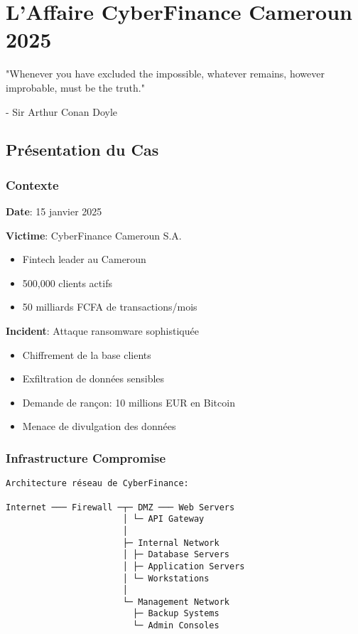 \chapter{L'Affaire CyberFinance Cameroun 2025}
\epigraph{"Whenever you have excluded the impossible, whatever remains, however improbable, must be the truth."}{- Sir Arthur Conan Doyle}
\section{Présentation du Cas}
\subsection{Contexte}
\textbf{Date}: 15 janvier 2025

\textbf{Victime}: CyberFinance Cameroun S.A.

\begin{itemize}
\item Fintech leader au Cameroun
\item 500,000 clients actifs
\item 50 milliards FCFA de transactions/mois
\end{itemize}

\textbf{Incident}: Attaque ransomware sophistiquée

\begin{itemize}
\item Chiffrement de la base clients
\item Exfiltration de données sensibles
\item Demande de rançon: 10 millions EUR en Bitcoin
\item Menace de divulgation des données
\end{itemize}

\subsection{Infrastructure Compromise}
\begin{verbatim}
Architecture réseau de CyberFinance:

Internet ─── Firewall ─┬─ DMZ ─── Web Servers
                       │ └─ API Gateway
                       │
                       ├─ Internal Network
                       │ ├─ Database Servers
                       │ ├─ Application Servers
                       │ └─ Workstations
                       │
                       └─ Management Network
                         ├─ Backup Systems
                         └─ Admin Consoles
\end{verbatim}

